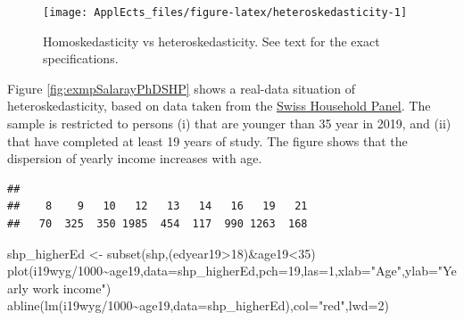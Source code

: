 \documentclass[
  12pt,
]{book}
\newenvironment{Shaded}{\begin{snugshade}}{\end{snugshade}}
\newcommand{\AttributeTok}[1]{\textcolor[rgb]{0.77,0.63,0.00}{#1}}
\newcommand{\DecValTok}[1]{\textcolor[rgb]{0.00,0.00,0.81}{#1}}
\newcommand{\FunctionTok}[1]{\textcolor[rgb]{0.00,0.00,0.00}{#1}}
\newcommand{\NormalTok}[1]{#1}
\newcommand{\OtherTok}[1]{\textcolor[rgb]{0.56,0.35,0.01}{#1}}
\newcommand{\SpecialCharTok}[1]{\textcolor[rgb]{0.00,0.00,0.00}{#1}}
\newcommand{\StringTok}[1]{\textcolor[rgb]{0.31,0.60,0.02}{#1}}
\theoremstyle{definition}
\theoremstyle{definition}
\theoremstyle{definition}
\theoremstyle{definition}
\theoremstyle{remark}
\begin{document}
\begin{figure}
\texttt{[image: ApplEcts\_files/figure-latex/heteroskedasticity-1]} \caption{Homoskedasticity vs heteroskedasticity. See text for the exact specifications.}\label{fig:heteroskedasticity}
\end{figure}

Figure \ref{fig:exmpSalarayPhDSHP} shows a real-data situation of heteroskedasticity, based on data taken from the \href{https://forscenter.ch/projects/swiss-household-panel/}{Swiss Household Panel}. The sample is restricted to persons (i) that are younger than 35 year in 2019, and (ii) that have completed at least 19 years of study. The figure shows that the dispersion of yearly income increases with age.

\begin{Shaded}
\end{Shaded}

\begin{verbatim}
## 
##    8    9   10   12   13   14   16   19   21 
##   70  325  350 1985  454  117  990 1263  168
\end{verbatim}

\begin{Shaded}
\begin{Highlighting}[]
\NormalTok{shp\_higherEd }\OtherTok{\textless{}{-}} \FunctionTok{subset}\NormalTok{(shp,(edyear19}\SpecialCharTok{\textgreater{}}\DecValTok{18}\NormalTok{)}\SpecialCharTok{\&}\NormalTok{age19}\SpecialCharTok{\textless{}}\DecValTok{35}\NormalTok{)}
\FunctionTok{plot}\NormalTok{(i19wyg}\SpecialCharTok{/}\DecValTok{1000}\SpecialCharTok{\textasciitilde{}}\NormalTok{age19,}\AttributeTok{data=}\NormalTok{shp\_higherEd,}\AttributeTok{pch=}\DecValTok{19}\NormalTok{,}\AttributeTok{las=}\DecValTok{1}\NormalTok{,}\AttributeTok{xlab=}\StringTok{"Age"}\NormalTok{,}\AttributeTok{ylab=}\StringTok{"Yearly work income"}\NormalTok{)}
\FunctionTok{abline}\NormalTok{(}\FunctionTok{lm}\NormalTok{(i19wyg}\SpecialCharTok{/}\DecValTok{1000}\SpecialCharTok{\textasciitilde{}}\NormalTok{age19,}\AttributeTok{data=}\NormalTok{shp\_higherEd),}\AttributeTok{col=}\StringTok{"red"}\NormalTok{,}\AttributeTok{lwd=}\DecValTok{2}\NormalTok{)}
\end{Highlighting}
\end{Shaded}
\end{document}
